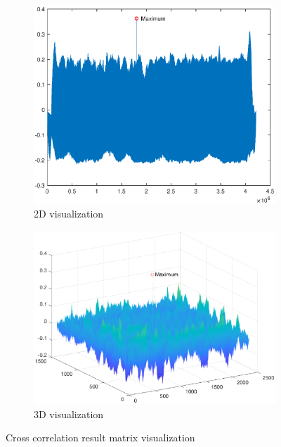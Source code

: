 \begin{figure}[h!]
	\centering
	\begin{subfigure}[t]{0.45\linewidth}
		\includegraphics[width=1\linewidth]{figures/part1/crr_vis1.eps}
		\caption{2D visualization}
		\label{fig:crr_vis1}
	\end{subfigure}
	\begin{subfigure}[t]{0.45\linewidth}
		\centering
		\includegraphics[width=1\linewidth]{figures/part1/crr_vis2.eps}
		\caption{3D visualization}
		\label{fig:crr_vis2}
	\end{subfigure}
	\caption{Cross correlation result matrix visualization}
\end{figure} 

